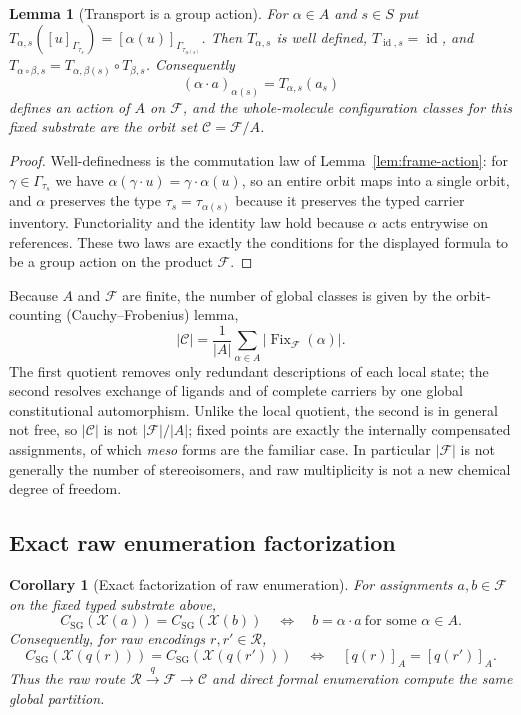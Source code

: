 \documentclass[pdflatex,sn-mathphys-num,referee,lineno]{sn-jnl}
\theoremstyle{plain}
\newtheorem{lemma}[theorem]{Lemma}
\newtheorem{corollary}[theorem]{Corollary}
\theoremstyle{remark}
\theoremstyle{definition}
\begin{document}
\begin{lemma}[Transport is a group action]
\label{lem:transport-action}
For \(\alpha\in A\) and \(s\in S\) put
\(T_{\alpha,s}\!\left([u]_{\Gamma_{\tau_s}}\right)
=[\alpha(u)]_{\Gamma_{\tau_{\alpha(s)}}}\).  Then \(T_{\alpha,s}\) is well
defined, \(T_{\operatorname{id},s}=\operatorname{id}\), and
\(T_{\alpha\circ\beta,s}=T_{\alpha,\beta(s)}\circ T_{\beta,s}\).  Consequently
\[
  (\alpha\cdot a)_{\alpha(s)}=T_{\alpha,s}(a_s)
\]
defines an action of \(A\) on \(\mathcal F\), and the whole-molecule
configuration classes for this fixed substrate are the orbit set
\(\mathcal C=\mathcal F/A\).
\end{lemma}

\begin{proof}
Well-definedness is the commutation law of Lemma~\ref{lem:frame-action}: for
\(\gamma\in\Gamma_{\tau_s}\) we have
\(\alpha(\gamma\cdot u)=\gamma\cdot\alpha(u)\), so an entire orbit maps into a
single orbit, and \(\alpha\) preserves the type \(\tau_s=\tau_{\alpha(s)}\)
because it preserves the typed carrier inventory.  Functoriality and the
identity law hold because \(\alpha\) acts entrywise on references.  These two
laws are exactly the conditions for the displayed formula to be a group action
on the product \(\mathcal F\).
\end{proof}

Because \(A\) and \(\mathcal F\) are finite, the number of global classes is
given by the orbit-counting (Cauchy--Frobenius) lemma,
\[
  \lvert\mathcal C\rvert
  =\frac{1}{\lvert A\rvert}
   \sum_{\alpha\in A}\lvert\operatorname{Fix}_{\mathcal F}(\alpha)\rvert .
\]
The first quotient removes only redundant descriptions of each local state; the
second resolves exchange of ligands and of complete carriers by one global
constitutional automorphism.  Unlike the local quotient, the second is in
general not free, so \(\lvert\mathcal C\rvert\) is not \(\lvert\mathcal
F\rvert/\lvert A\rvert\); fixed points are exactly the internally compensated
assignments, of which \emph{meso} forms are the familiar case.  In particular
\(\lvert\mathcal F\rvert\) is not generally the number of stereoisomers, and
raw multiplicity is not a new chemical degree of freedom.



\subsection{Exact raw enumeration factorization}

\begin{corollary}[Exact factorization of raw enumeration]
\label{cor:raw-formal-global}
For assignments \(a,b\in\mathcal F\) on the fixed typed substrate above,
\[
 C_{\mathrm{SG}}(\mathcal X(a))=C_{\mathrm{SG}}(\mathcal X(b))
 \quad\Longleftrightarrow\quad
 b=\alpha\cdot a\ \text{for some }\alpha\in A.
\]
Consequently, for raw encodings \(r,r'\in\mathcal R\),
\[
 C_{\mathrm{SG}}(\mathcal X(q(r)))
 =C_{\mathrm{SG}}(\mathcal X(q(r')))
 \quad\Longleftrightarrow\quad
 [q(r)]_A=[q(r')]_A.
\]
Thus the raw route \(\mathcal R\xrightarrow{q}\mathcal F\to\mathcal C\)
and direct formal enumeration compute the same global partition.
\end{corollary}
\end{document}

